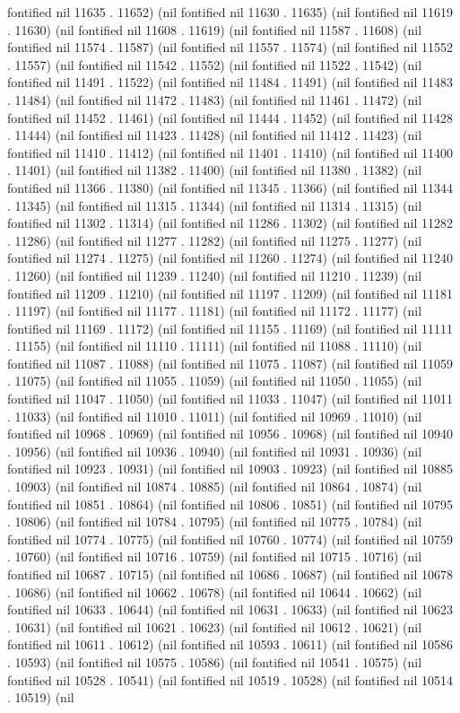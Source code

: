 fontified nil 11635 . 11652) (nil fontified nil 11630 . 11635) (nil fontified nil 11619 . 11630) (nil fontified nil 11608 . 11619) (nil fontified nil 11587 . 11608) (nil fontified nil 11574 . 11587) (nil fontified nil 11557 . 11574) (nil fontified nil 11552 . 11557) (nil fontified nil 11542 . 11552) (nil fontified nil 11522 . 11542) (nil fontified nil 11491 . 11522) (nil fontified nil 11484 . 11491) (nil fontified nil 11483 . 11484) (nil fontified nil 11472 . 11483) (nil fontified nil 11461 . 11472) (nil fontified nil 11452 . 11461) (nil fontified nil 11444 . 11452) (nil fontified nil 11428 . 11444) (nil fontified nil 11423 . 11428) (nil fontified nil 11412 . 11423) (nil fontified nil 11410 . 11412) (nil fontified nil 11401 . 11410) (nil fontified nil 11400 . 11401) (nil fontified nil 11382 . 11400) (nil fontified nil 11380 . 11382) (nil fontified nil 11366 . 11380) (nil fontified nil 11345 . 11366) (nil fontified nil 11344 . 11345) (nil fontified nil 11315 . 11344) (nil fontified nil 11314 . 11315) (nil fontified nil 11302 . 11314) (nil fontified nil 11286 . 11302) (nil fontified nil 11282 . 11286) (nil fontified nil 11277 . 11282) (nil fontified nil 11275 . 11277) (nil fontified nil 11274 . 11275) (nil fontified nil 11260 . 11274) (nil fontified nil 11240 . 11260) (nil fontified nil 11239 . 11240) (nil fontified nil 11210 . 11239) (nil fontified nil 11209 . 11210) (nil fontified nil 11197 . 11209) (nil fontified nil 11181 . 11197) (nil fontified nil 11177 . 11181) (nil fontified nil 11172 . 11177) (nil fontified nil 11169 . 11172) (nil fontified nil 11155 . 11169) (nil fontified nil 11111 . 11155) (nil fontified nil 11110 . 11111) (nil fontified nil 11088 . 11110) (nil fontified nil 11087 . 11088) (nil fontified nil 11075 . 11087) (nil fontified nil 11059 . 11075) (nil fontified nil 11055 . 11059) (nil fontified nil 11050 . 11055) (nil fontified nil 11047 . 11050) (nil fontified nil 11033 . 11047) (nil fontified nil 11011 . 11033) (nil fontified nil 11010 . 11011) (nil fontified nil 10969 . 11010) (nil fontified nil 10968 . 10969) (nil fontified nil 10956 . 10968) (nil fontified nil 10940 . 10956) (nil fontified nil 10936 . 10940) (nil fontified nil 10931 . 10936) (nil fontified nil 10923 . 10931) (nil fontified nil 10903 . 10923) (nil fontified nil 10885 . 10903) (nil fontified nil 10874 . 10885) (nil fontified nil 10864 . 10874) (nil fontified nil 10851 . 10864) (nil fontified nil 10806 . 10851) (nil fontified nil 10795 . 10806) (nil fontified nil 10784 . 10795) (nil fontified nil 10775 . 10784) (nil fontified nil 10774 . 10775) (nil fontified nil 10760 . 10774) (nil fontified nil 10759 . 10760) (nil fontified nil 10716 . 10759) (nil fontified nil 10715 . 10716) (nil fontified nil 10687 . 10715) (nil fontified nil 10686 . 10687) (nil fontified nil 10678 . 10686) (nil fontified nil 10662 . 10678) (nil fontified nil 10644 . 10662) (nil fontified nil 10633 . 10644) (nil fontified nil 10631 . 10633) (nil fontified nil 10623 . 10631) (nil fontified nil 10621 . 10623) (nil fontified nil 10612 . 10621) (nil fontified nil 10611 . 10612) (nil fontified nil 10593 . 10611) (nil fontified nil 10586 . 10593) (nil fontified nil 10575 . 10586) (nil fontified nil 10541 . 10575) (nil fontified nil 10528 . 10541) (nil fontified nil 10519 . 10528) (nil fontified nil 10514 . 10519) (nil 